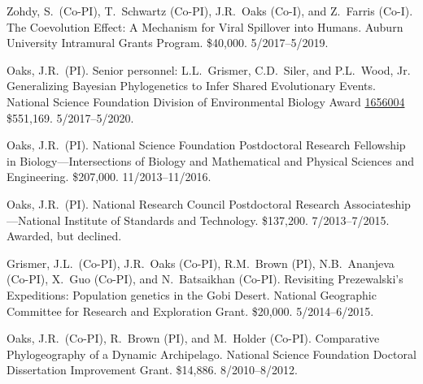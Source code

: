 \myHangIndent
Zohdy, S.\ (Co-PI), T.\ Schwartz (Co-PI), J.R.\ Oaks (Co-I), and Z.\ Farris (Co-I).
The Coevolution Effect: A Mechanism for Viral Spillover into Humans.
Auburn University Intramural Grants Program.
\$40,000.
5/2017--5/2019.

\myHangIndent
Oaks, J.R.\ (PI).
Senior personnel: L.L.\ Grismer, C.D.\ Siler, and P.L.\ Wood, Jr.
Generalizing Bayesian Phylogenetics to Infer Shared Evolutionary Events.
National Science Foundation Division of Environmental Biology Award
\href{https://www.nsf.gov/awardsearch/showAward?AWD_ID=1656004&HistoricalAwards=false}{1656004}
\$551,169.
5/2017--5/2020.

\myHangIndent
Oaks, J.R.\ (PI).
National Science Foundation Postdoctoral Research Fellowship in
Biology---Intersections of Biology and Mathematical and Physical Sciences and
Engineering.
\$207,000.
11/2013--11/2016.

\myHangIndent
Oaks, J.R.\ (PI).
National Research Council Postdoctoral Research Associateship---National
Institute of Standards and Technology.
\$137,200.
7/2013--7/2015.
Awarded, but declined.

\myHangIndent
Grismer, J.L.\ (Co-PI), J.R.\ Oaks (Co-PI), R.M.\ Brown (PI), N.B.\ Ananjeva
(Co-PI), X.\ Guo (Co-PI), and N.\ Batsaikhan (Co-PI).
Revisiting Prezewalski's Expeditions: Population genetics in the Gobi Desert.
National Geographic Committee for Research and Exploration Grant.
\$20,000.
5/2014--6/2015.

\myHangIndent
Oaks, J.R.\ (Co-PI), R.\ Brown (PI), and M.\ Holder (Co-PI).
Comparative Phylogeography of a Dynamic Archipelago.
National Science Foundation Doctoral Dissertation Improvement Grant.
\$14,886.
8/2010--8/2012.
